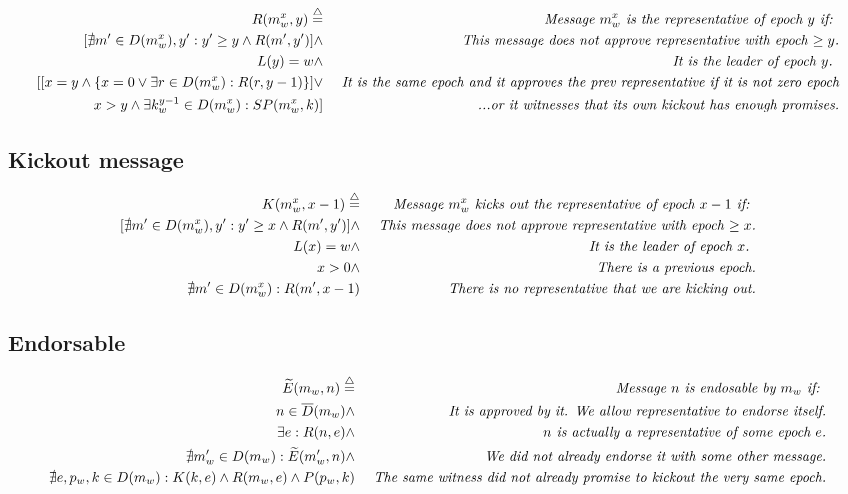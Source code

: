 \documentclass{article}
\begin{document}
\[
\begin{aligned}
R(m_w^x, y) \buildrel\triangle\over =& \text{   } &\textit{Message $m_w^x$ is the representative of epoch $y$ if: } \\
[\nexists m'\in D(m_w^x), y': y'\geq y \land R(m', y') ] \land & & \textit{This message does not approve representative with epoch $\geq y$.} \\
L(y) = w \land & & \textit{It is the leader of epoch $y$. } \\
[[ x=y \land \{ x = 0 \lor \exists r\in D(m_w^x) : R(r, y-1)\} ] \lor & & \textit{It is the same epoch and it approves the prev representative if it is not zero epoch} \\
x>y\land \exists k_w^{y-1}\in D(m_w^x): SP(m_w^x, k) ] & & \textit{...or it witnesses that its own kickout has enough promises.}
\end{aligned}
\]

\subsection*{Kickout message}
\[
\begin{aligned}
K(m_w^x, x-1) \buildrel\triangle\over =& \text{   } &\textit{Message $m_w^x$ kicks out the representative of epoch $x-1$ if: } \\
[\nexists m'\in D(m_w^x), y': y'\geq x \land R(m', y') ] \land & & \textit{This message does not approve representative with epoch $\geq x$.} \\
L(x) = w \land & & \textit{It is the leader of epoch $x$. } \\
x > 0 \land & & \textit{There is a previous epoch.} \\
\nexists m'\in D(m_w^x): R(m', x-1) & & \textit{There is no representative that we are kicking out.}
\end{aligned}
\]

\subsection*{Endorsable}
\[
\begin{aligned}
\widetilde{E}(m_w, n)  \buildrel\triangle\over = & \text{   } &\textit{Message $n$ is endosable by $m_w$ if: } \\
n \in \overline{D}(m_w) \land & & \textit{It is approved by it. We allow representative to endorse itself.} \\
\exists e: R(n,e) \land & & \textit{$n$ is actually a representative of some epoch $e$.} \\
\nexists m'_w \in D(m_w): \widetilde{E}(m'_w, n) \land && \textit{We did not already endorse it with some other message.} \\
\nexists e,p_w, k\in D(m_w): K(k, e)\land R(m_w, e)\land P(p_w, k) & & \textit{The same witness did not already promise to kickout the very same epoch.}
\end{aligned}
\]
\end{document}
